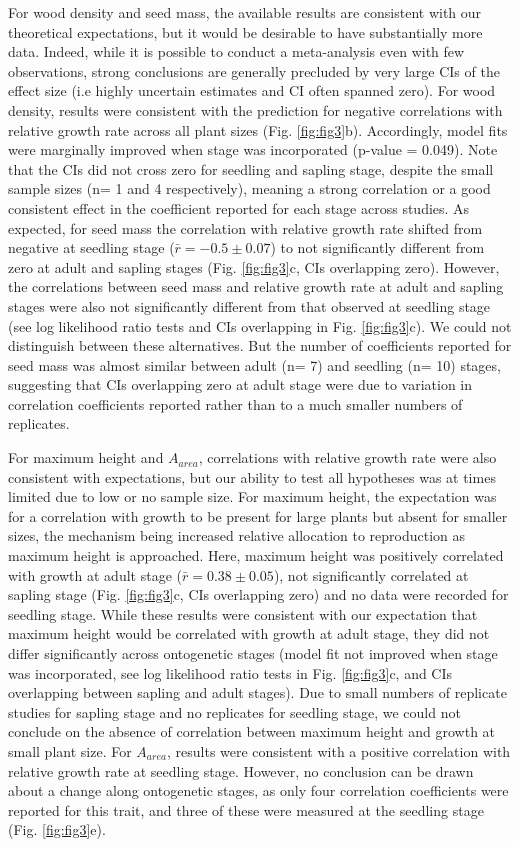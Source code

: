 \documentclass[a4paper,11pt]{article}
\begin{document}
For wood density and seed mass, the available results are consistent with our theoretical expectations, but it would be desirable to have substantially more data. Indeed, while it is possible to conduct a meta-analysis even with few observations, strong conclusions are generally precluded by very large CIs of the effect size (i.e highly uncertain estimates and CI often spanned zero). 
For wood density, results were consistent with the prediction for negative correlations with relative growth rate across all plant sizes (Fig. \ref{fig:fig3}b). Accordingly, model fits were marginally improved when stage was incorporated (p-value = 0.049). Note that the CIs did not cross zero for seedling and sapling stage, despite the small sample sizes (n= 1 and 4 respectively), meaning a strong correlation or a good consistent effect in the coefficient reported for each stage across studies. 
As expected, for seed mass the correlation with relative growth rate shifted from negative at seedling stage ($\bar{r}= -0.5 \pm 0.07$) to not significantly different from zero at adult and sapling stages (Fig. \ref{fig:fig3}c, CIs overlapping zero). However, the correlations between seed mass and relative growth rate at adult and sapling stages were also not significantly different from that observed at seedling stage (see log likelihood ratio tests and CIs overlapping in Fig. \ref{fig:fig3}c). We could not distinguish between these alternatives. But the number of coefficients reported for seed mass was almost similar between adult (n= 7) and seedling (n= 10) stages, suggesting that CIs overlapping zero at adult stage were due to variation in correlation coefficients reported rather than to a much smaller numbers of replicates.

For maximum height and $A_{area}$, correlations with relative growth rate were also consistent with expectations, but our ability to test all hypotheses was at times limited due to low or no sample size. For maximum height, the expectation was for a correlation with growth to be present for large plants but absent for smaller sizes, the mechanism being increased relative allocation to reproduction as maximum height is approached. Here, maximum height was positively correlated with growth at adult stage ($\bar{r}= 0.38 \pm 0.05$), not significantly correlated at sapling stage (Fig. \ref{fig:fig3}c, CIs overlapping zero) and no data were recorded for seedling stage. While these results were consistent with our expectation that maximum height would be correlated with growth at adult stage, they did not differ significantly across ontogenetic stages (model fit not improved when stage was incorporated, see log likelihood ratio tests in Fig. \ref{fig:fig3}c, and CIs overlapping between sapling and adult stages). Due to small numbers of replicate studies for sapling stage and no replicates for seedling stage, we could not conclude on the absence of correlation between maximum height and growth at small plant size.
For $A_{area}$, results were consistent with a positive correlation with relative growth rate at seedling stage. However, no conclusion can be drawn about a change along ontogenetic stages, as only four correlation coefficients were reported for this trait, and three of these were measured at the seedling stage (Fig. \ref{fig:fig3}e).
\end{document}
